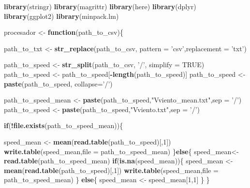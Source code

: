 \documentclass[]{article}
\newenvironment{Shaded}{\begin{snugshade}}{\end{snugshade}}
\newcommand{\KeywordTok}[1]{\textcolor[rgb]{0.13,0.29,0.53}{\textbf{#1}}}
\newcommand{\DataTypeTok}[1]{\textcolor[rgb]{0.13,0.29,0.53}{#1}}
\newcommand{\DecValTok}[1]{\textcolor[rgb]{0.00,0.00,0.81}{#1}}
\newcommand{\StringTok}[1]{\textcolor[rgb]{0.31,0.60,0.02}{#1}}
\newcommand{\OtherTok}[1]{\textcolor[rgb]{0.56,0.35,0.01}{#1}}
\newcommand{\ControlFlowTok}[1]{\textcolor[rgb]{0.13,0.29,0.53}{\textbf{#1}}}
\newcommand{\OperatorTok}[1]{\textcolor[rgb]{0.81,0.36,0.00}{\textbf{#1}}}
\newcommand{\NormalTok}[1]{#1}
\begin{document}
\begin{Shaded}
\begin{Highlighting}[]
\KeywordTok{library}\NormalTok{(stringr)}
\KeywordTok{library}\NormalTok{(magrittr)}
\KeywordTok{library}\NormalTok{(here)}
\KeywordTok{library}\NormalTok{(dplyr)}
\KeywordTok{library}\NormalTok{(ggplot2)}
\KeywordTok{library}\NormalTok{(minpack.lm)}

\NormalTok{procesador <-}\StringTok{ }\ControlFlowTok{function}\NormalTok{(path_to_csv)\{}
  
\NormalTok{  path_to_txt <-}\StringTok{ }\KeywordTok{str_replace}\NormalTok{(path_to_csv, }\DataTypeTok{pattern =} \StringTok{'csv'}\NormalTok{,}\DataTypeTok{replacement =} \StringTok{'txt'}\NormalTok{)}
  
\NormalTok{  path_to_speed <-}\StringTok{ }\KeywordTok{str_split}\NormalTok{(path_to_csv, }\StringTok{'/'}\NormalTok{, }\DataTypeTok{simplify =} \OtherTok{TRUE}\NormalTok{)}
\NormalTok{  path_to_speed <-}\StringTok{ }\NormalTok{path_to_speed[}\OperatorTok{-}\KeywordTok{length}\NormalTok{(path_to_speed)]}
\NormalTok{  path_to_speed <-}\StringTok{ }\KeywordTok{paste}\NormalTok{(path_to_speed, }\DataTypeTok{collapse=}\StringTok{'/'}\NormalTok{)}
  
\NormalTok{  path_to_speed_mean <-}\StringTok{ }\KeywordTok{paste}\NormalTok{(path_to_speed,}\StringTok{"Vviento_mean.txt"}\NormalTok{,}\DataTypeTok{sep =} \StringTok{'/'}\NormalTok{)}
\NormalTok{  path_to_speed <-}\StringTok{ }\KeywordTok{paste}\NormalTok{(path_to_speed,}\StringTok{"Vviento.txt"}\NormalTok{,}\DataTypeTok{sep =} \StringTok{'/'}\NormalTok{)}
  
  \ControlFlowTok{if}\NormalTok{(}\OperatorTok{!}\KeywordTok{file.exists}\NormalTok{(path_to_speed_mean))\{}
    
\NormalTok{    speed_mean <-}\StringTok{ }\KeywordTok{mean}\NormalTok{(}\KeywordTok{read.table}\NormalTok{(path_to_speed)[,}\DecValTok{1}\NormalTok{])}
    \KeywordTok{write.table}\NormalTok{(speed_mean,}\DataTypeTok{file =}\NormalTok{ path_to_speed_mean)}
\NormalTok{  \}}\ControlFlowTok{else}\NormalTok{\{}
\NormalTok{    speed_mean<-}\StringTok{ }\KeywordTok{read.table}\NormalTok{(path_to_speed_mean)}
    \ControlFlowTok{if}\NormalTok{(}\KeywordTok{is.na}\NormalTok{(speed_mean))\{}
\NormalTok{      speed_mean <-}\StringTok{ }\KeywordTok{mean}\NormalTok{(}\KeywordTok{read.table}\NormalTok{(path_to_speed)[,}\DecValTok{1}\NormalTok{])}
      \KeywordTok{write.table}\NormalTok{(speed_mean,}\DataTypeTok{file =}\NormalTok{ path_to_speed_mean) }
\NormalTok{    \} }\ControlFlowTok{else}\NormalTok{\{}
\NormalTok{      speed_mean <-}\StringTok{ }\NormalTok{speed_mean[}\DecValTok{1}\NormalTok{,}\DecValTok{1}\NormalTok{]}
\NormalTok{    \}}
\NormalTok{  \}}
  

\end{Highlighting}
\end{Shaded}
\end{document}
